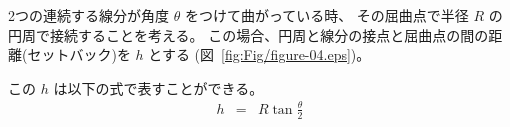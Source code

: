 \documentclass[11pt,a4j]{jarticle}
\def\figref#1{図~\ref{#1}}
\begin{document}
2つの連続する線分が角度 $\theta$ をつけて曲がっている時、
その屈曲点で半径 $R$ の円周で接続することを考える。
この場合、円周と線分の接点と屈曲点の間の距離(セットバック)を $h$ とする
(\figref{fig:Fig/figure-04.eps})。

この $h$ は以下の式で表すことができる。
  \begin{eqnarray}
    h
      & = &
        R \tan \frac{\theta}{2}
  \end{eqnarray}



  
\end{document}
